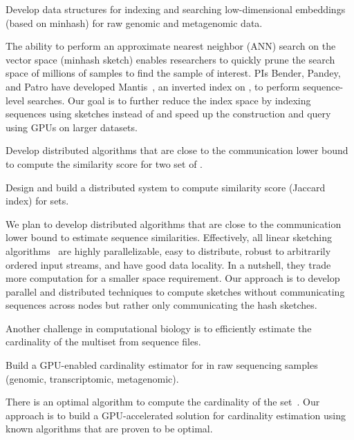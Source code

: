 \begin{rproblem}
Develop data structures for indexing and searching low-dimensional embeddings (based on minhash) for raw genomic and metagenomic data.
\end{rproblem}

The ability to perform an approximate nearest neighbor (ANN) search on the vector space (minhash sketch) enables researchers to quickly prune the search space of millions of samples to find the sample of interest. PIs  Bender, Pandey, and Patro have developed Mantis~\cite{PandeyAlBe18}, an inverted index on \kmers, to perform sequence-level searches. Our goal is to further reduce the index space by indexing sequences using sketches instead of \kmers and speed up the construction and query using GPUs on larger datasets.

\begin{rproblem}
Develop distributed algorithms that are close to the communication lower bound to  compute the similarity score for two set of \kmers.
\end{rproblem}

\begin{rproblem}
Design and build a distributed system to compute similarity score (Jaccard index) for \kmer sets.
\end{rproblem}

We plan to develop distributed algorithms that are close to the communication lower bound to estimate sequence similarities. Effectively, all linear sketching algorithms~\cite{li2014sketchuniversal} are highly parallelizable, easy to distribute, robust to arbitrarily ordered input streams, and have good data locality. In a nutshell, they trade more computation for a smaller space requirement. Our approach is to develop parallel and distributed techniques to compute sketches without communicating sequences across nodes but rather only communicating the hash sketches.

Another challenge in computational biology is to efficiently estimate the cardinality of the \kmer multiset from sequence files. 


\begin{rproblem}
Build a GPU-enabled cardinality estimator for \kmers in raw sequencing samples (genomic, transcriptomic, metagenomic).
\end{rproblem}

There is an optimal algorithm to compute the cardinality of the set~\cite{Kane2010}.
Our approach is to build a GPU-accelerated solution for cardinality estimation using known algorithms that are proven to be optimal.

